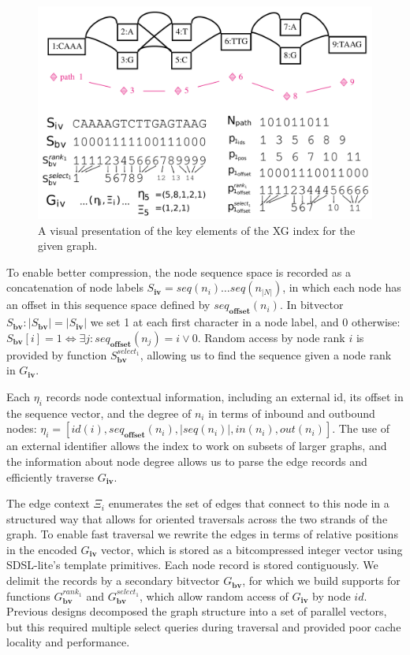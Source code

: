 \begin{figure}[htbp!]
  \includegraphics[width=\textwidth]{Chapter2/Figs/xg_index_sketch_nice.pdf}
  \caption[A sketch of the XG index]{
    A visual presentation of the key elements of the XG index for the given graph.
  }
  \label{fig:xg_index}
\end{figure}

To enable better compression, the node sequence space is recorded as a concatenation of node labels $S_\textbf{iv} = seq(n_i) \ldots seq(n_{|N|})$, in which each node has an offset in this sequence space defined by $seq_\textbf{offset}(n_i)$.
In bitvector $S_\textbf{bv} : |S_\textbf{bv}| = |S_\textbf{iv}|$ we set 1 at each first character in a node label, and 0 otherwise: $S_\textbf{bv}[i] = 1 \iff \exists j : seq_\textbf{offset}(n_j) = i \lor 0$.
Random access by node rank $i$ is provided by function $S_\textbf{bv}^{select_1}$, allowing us to find the sequence given a node rank in $G_\textbf{iv}$.

Each $\eta_i$ records node contextual information, including an external id, its offset in the sequence vector, and the degree of $n_i$ in terms of inbound and outbound nodes: $\eta_i = \left[ id(i), seq_\textbf{offset}(n_i), |seq(n_i)|, in(n_i), out(n_i) \right]$.
The use of an external identifier allows the index to work on subsets of larger graphs, and the information about node degree allows us to parse the edge records and efficiently traverse $G_\textbf{iv}$.

The edge context $\Xi_i$ enumerates the set of edges that connect to this node in a structured way that allows for oriented traversals across the two strands of the graph.
To enable fast traversal we rewrite the edges in terms of relative positions in the encoded $G_\textbf{iv}$ vector, which is stored as a bitcompressed integer vector using SDSL-lite's template primitives.
Each node record is stored contiguously.
We delimit the records by a secondary bitvector $G_\textbf{bv}$, for which we build supports for functions $G_\textbf{bv}^{rank_1}$ and $G_\textbf{bv}^{select_1}$, which allow random access of $G_\textbf{iv}$ by node $id$.
Previous designs decomposed the graph structure into a set of parallel vectors, but this required multiple select queries during traversal and provided poor cache locality and performance.

